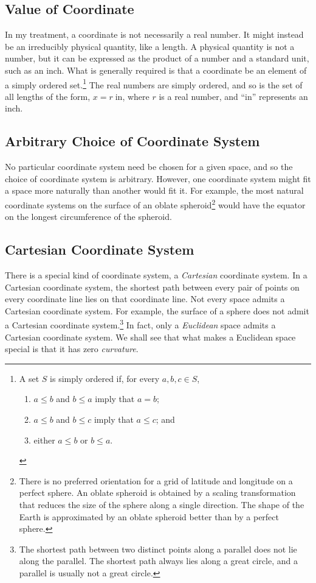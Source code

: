 \subsection{Value of Coordinate}

In my treatment, a coordinate is not necessarily a real number.  It might
instead be an irreducibly physical quantity, like a length.  A physical
quantity is not a number, but it can be expressed as the product of a number
and a standard unit, such as an inch.  What is generally required is that a
coordinate be an element of a simply ordered set.\footnote{%
   A set $S$ is simply ordered if, for every $a, b, c \in S$,
   \begin{enumerate}
      \item $a \leq b$ and $b \leq a$ imply that $a = b$;
      \item $a \leq b$ and $b \leq c$ imply that $a \leq c$; and
      \item either $a \leq b$ or $b \leq a$.
   \end{enumerate}%
}
The real numbers are simply ordered, and so is the set of all lengths of the
form, $x = r \; \text{in}$, where $r$ is a real number, and ``$\text{in}$''
represents an inch.

\subsection{Arbitrary Choice of Coordinate System}

No particular coordinate system need be chosen for a given space, and so the
choice of coordinate system is arbitrary.  However, one coordinate system might
fit a space more naturally than another would fit it.  For example, the most
natural coordinate systems on the surface of an oblate
spheroid\footnote[][-0.9in]{%
   There is no preferred orientation for a grid of latitude and longitude on a
   perfect sphere.  An oblate spheroid is obtained by a scaling transformation
   that reduces the size of the sphere along a single direction.  The shape of
   the Earth is approximated by an oblate spheroid better than by a perfect
   sphere.%
}
would have the equator on the longest circumference of the spheroid.

\subsection{Cartesian Coordinate System}

There is a special kind of coordinate system, a \emph{Cartesian} coordinate
system.  In a Cartesian coordinate system, the shortest path between every pair
of points on every coordinate line lies on that coordinate line.  Not every
space admits a Cartesian coordinate system.  For example, the surface of a
sphere does not admit a Cartesian coordinate system.\footnote{%
   The shortest path between two distinct points along a parallel does not lie
   along the parallel.  The shortest path always lies along a great circle, and
   a parallel is usually not a great circle.%
}
In fact, only a \emph{Euclidean} space admits a Cartesian coordinate system.
We shall see that what makes a Euclidean space special is that it has zero
\emph{curvature}.

